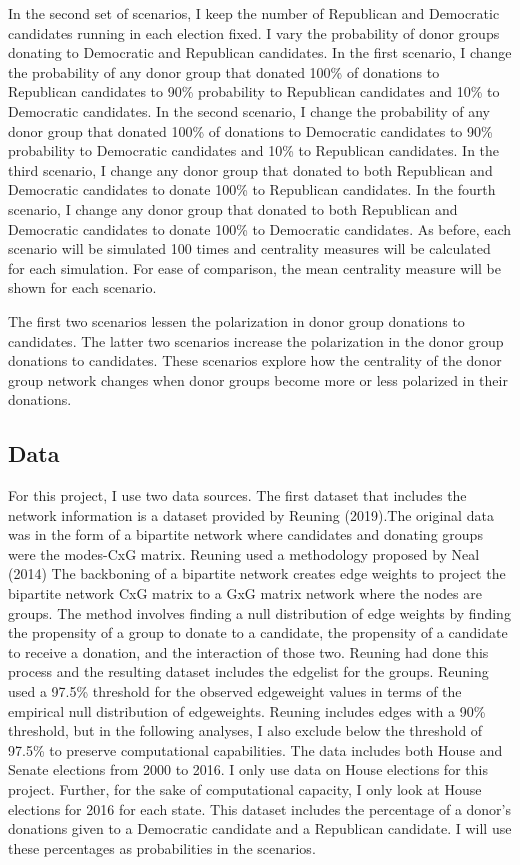 \documentclass[]{article}
\begin{document}
In the second set of scenarios, I keep the number of Republican and
Democratic candidates running in each election fixed. I vary the
probability of donor groups donating to Democratic and Republican
candidates. In the first scenario, I change the probability of any donor
group that donated 100\% of donations to Republican candidates to 90\%
probability to Republican candidates and 10\% to Democratic candidates.
In the second scenario, I change the probability of any donor group that
donated 100\% of donations to Democratic candidates to 90\% probability
to Democratic candidates and 10\% to Republican candidates. In the third
scenario, I change any donor group that donated to both Republican and
Democratic candidates to donate 100\% to Republican candidates. In the
fourth scenario, I change any donor group that donated to both
Republican and Democratic candidates to donate 100\% to Democratic
candidates. As before, each scenario will be simulated 100 times and
centrality measures will be calculated for each simulation. For ease of
comparison, the mean centrality measure will be shown for each scenario.

The first two scenarios lessen the polarization in donor group donations
to candidates. The latter two scenarios increase the polarization in the
donor group donations to candidates. These scenarios explore how the
centrality of the donor group network changes when donor groups become
more or less polarized in their donations.

\subsection{Data}\label{data}

For this project, I use two data sources. The first dataset that
includes the network information is a dataset provided by Reuning
(2019).The original data was in the form of a bipartite network where
candidates and donating groups were the modes-CxG matrix. Reuning used a
methodology proposed by Neal (2014) The backboning of a bipartite
network creates edge weights to project the bipartite network CxG matrix
to a GxG matrix network where the nodes are groups. The method involves
finding a null distribution of edge weights by finding the propensity of
a group to donate to a candidate, the propensity of a candidate to
receive a donation, and the interaction of those two. Reuning had done
this process and the resulting dataset includes the edgelist for the
groups. Reuning used a 97.5\% threshold for the observed edgeweight
values in terms of the empirical null distribution of edgeweights.
Reuning includes edges with a 90\% threshold, but in the following
analyses, I also exclude below the threshold of 97.5\% to preserve
computational capabilities. The data includes both House and Senate
elections from 2000 to 2016. I only use data on House elections for this
project. Further, for the sake of computational capacity, I only look at
House elections for 2016 for each state. This dataset includes the
percentage of a donor's donations given to a Democratic candidate and a
Republican candidate. I will use these percentages as probabilities in
the scenarios.
\end{document}
